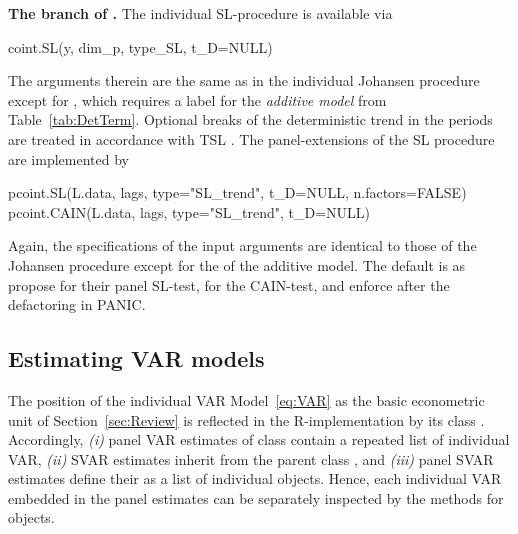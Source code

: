 \textbf{The branch of \citeauthor{SaikkonenLutkepohl2000}.} The individual SL-procedure is available via
\begin{CodeChunk}
\begin{CodeInput}
coint.SL(y, dim_p, type_SL, t_D=NULL)
\end{CodeInput}
\end{CodeChunk}
The arguments therein are the same as in the individual Johansen procedure except for , which requires a label for the \textit{additive model} from Table~\ref{tab:DetTerm}. Optional breaks of the deterministic trend in the periods   are treated in accordance with TSL \citeyearpar{TrenklerEtAl2008}. The panel-extensions of the SL procedure are implemented by
\begin{CodeChunk}
\begin{CodeInput}
pcoint.SL(L.data,   lags, type="SL_trend", t_D=NULL, n.factors=FALSE)
pcoint.CAIN(L.data, lags, type="SL_trend", t_D=NULL)
\end{CodeInput}
\end{CodeChunk}
Again, the specifications of the input arguments are identical to those of the Johansen procedure  except for the  of the additive model. The default is  as \citet{OersalDroge2014} propose for their panel SL-test, \citet{ArsovaOersal2020} for the CAIN-test, and \citeauthor{ArsovaOersal2017} \citeyearpar{ArsovaOersal2017,ArsovaOersal2018} enforce after the defactoring in PANIC.


\subsection{Estimating VAR models} \label{sec:pvarx}
The position of the individual VAR Model~\eqref{eq:VAR} as the basic econometric unit of Section~\ref{sec:Review} is reflected in the \textsf{R}-implementation by its class . Accordingly, \textit{(i)} panel VAR estimates of class  contain a repeated list  of individual VAR, \textit{(ii)} SVAR estimates  inherit from the parent class , and \textit{(iii)} panel SVAR estimates  define their  as a list of individual  objects. Hence, each individual VAR embedded in the panel estimates can be separately inspected by the methods for  objects.

